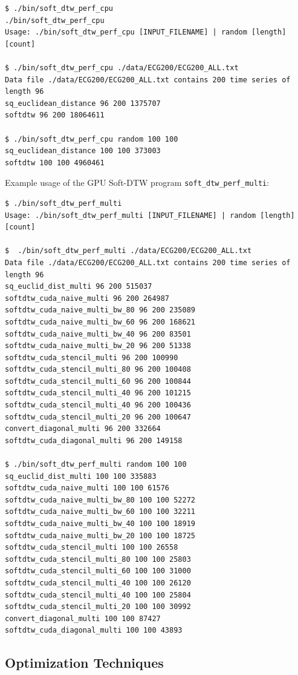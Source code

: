 \documentclass[12pt, letterpaper]{article}
\begin{document}
\begin{verbatim}
$ ./bin/soft_dtw_perf_cpu
./bin/soft_dtw_perf_cpu
Usage: ./bin/soft_dtw_perf_cpu [INPUT_FILENAME] | random [length] [count]

$ ./bin/soft_dtw_perf_cpu ./data/ECG200/ECG200_ALL.txt
Data file ./data/ECG200/ECG200_ALL.txt contains 200 time series of length 96
sq_euclidean_distance 96 200 1375707
softdtw 96 200 18064611

$ ./bin/soft_dtw_perf_cpu random 100 100
sq_euclidean_distance 100 100 373003
softdtw 100 100 4960461

\end{verbatim}

Example usage of the GPU Soft-DTW program \verb|soft_dtw_perf_multi|:

\begin{verbatim}
$ ./bin/soft_dtw_perf_multi
Usage: ./bin/soft_dtw_perf_multi [INPUT_FILENAME] | random [length] [count]

$  ./bin/soft_dtw_perf_multi ./data/ECG200/ECG200_ALL.txt
Data file ./data/ECG200/ECG200_ALL.txt contains 200 time series of length 96
sq_euclid_dist_multi 96 200 515037
softdtw_cuda_naive_multi 96 200 264987
softdtw_cuda_naive_multi_bw_80 96 200 235089
softdtw_cuda_naive_multi_bw_60 96 200 168621
softdtw_cuda_naive_multi_bw_40 96 200 83501
softdtw_cuda_naive_multi_bw_20 96 200 51338
softdtw_cuda_stencil_multi 96 200 100990
softdtw_cuda_stencil_multi_80 96 200 100408
softdtw_cuda_stencil_multi_60 96 200 100844
softdtw_cuda_stencil_multi_40 96 200 101215
softdtw_cuda_stencil_multi_40 96 200 100436
softdtw_cuda_stencil_multi_20 96 200 100647
convert_diagonal_multi 96 200 332664
softdtw_cuda_diagonal_multi 96 200 149158

$ ./bin/soft_dtw_perf_multi random 100 100
sq_euclid_dist_multi 100 100 335883
softdtw_cuda_naive_multi 100 100 61576
softdtw_cuda_naive_multi_bw_80 100 100 52272
softdtw_cuda_naive_multi_bw_60 100 100 32211
softdtw_cuda_naive_multi_bw_40 100 100 18919
softdtw_cuda_naive_multi_bw_20 100 100 18725
softdtw_cuda_stencil_multi 100 100 26558
softdtw_cuda_stencil_multi_80 100 100 25803
softdtw_cuda_stencil_multi_60 100 100 31000
softdtw_cuda_stencil_multi_40 100 100 26120
softdtw_cuda_stencil_multi_40 100 100 25804
softdtw_cuda_stencil_multi_20 100 100 30992
convert_diagonal_multi 100 100 87427
softdtw_cuda_diagonal_multi 100 100 43893
\end{verbatim}
\newpage
\subsection{Optimization Techniques}
\end{document}

